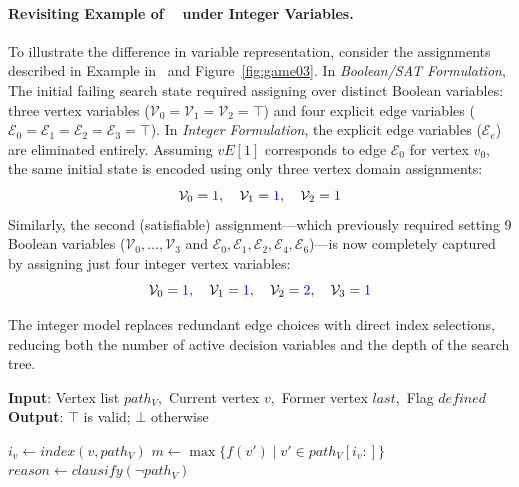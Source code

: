 \documentclass{article}
\begin{document}
\begin{appendices}
\paragraph{Revisiting Example of ~\cite{Hernandez:2026:noc} under Integer Variables.}
To illustrate the difference in variable representation, consider the assignments described in Example in~\cite{Hernandez:2026:noc} and Figure~\ref{fig:game03}.  In \textit{Boolean/SAT Formulation}, The initial failing search state required assigning over  distinct Boolean variables: three vertex variables ($\mathcal{V}_0 = \mathcal{V}_1 = \mathcal{V}_2 = \top$) and four explicit edge variables ($\mathcal{E}_0 = \mathcal{E}_1 = \mathcal{E}_2 = \mathcal{E}_3 = \top$).  In \textit{Integer Formulation}, the explicit edge variables ($\mathcal{E}_e$) are eliminated entirely. Assuming $vE[1]$ corresponds to edge $\mathcal{E}_0$ for vertex $v_0$, the same initial state is encoded using only three vertex domain assignments:
\[
    \mathcal{V}_0 = \textcolor{blue}{1}, \quad \mathcal{V}_1 = \textcolor{blue}{1}, \quad \mathcal{V}_2 = \textcolor{blue}{1}
\]
Similarly, the second (satisfiable) assignment—which previously required setting 9 Boolean variables ($\mathcal{V}_0, \dots, \mathcal{V}_3$ and $\mathcal{E}_0, \mathcal{E}_1, \mathcal{E}_2, \mathcal{E}_4, \mathcal{E}_6$)—is now completely captured by assigning just four integer vertex variables:
\[
    \mathcal{V}_0 = \textcolor{blue}{1}, \quad \mathcal{V}_1 = \textcolor{blue}{1}, \quad \mathcal{V}_2 = \textcolor{blue}{2}, \quad \mathcal{V}_3 = \textcolor{blue}{1}
\]

The integer model replaces redundant edge choices with direct index selections, reducing both the number of active decision variables and the depth of the search tree.

\begin{algorithm}[htb]
\small
\caption{\textbf{\textit{NOCEagerInt}}}
\textbf{Input}: Vertex list $path_V$,\ Current vertex $v$,\ Former vertex $\textit{last}$,\ Flag $\textit{defined}$ \\
\textbf{Output}: $\top$ is valid; $\bot$ otherwise
\begin{algorithmic}[1]
     \label{alg:noc-eager-int:pathcheck}
        \STATE $i_v \gets \textit{index}(v, path_V)$
        \STATE $m \gets \max\{f(v') \mid v' \in path_V[i_v:]\}$
         \label{alg:noc-eager-int:checkopponent}
            \STATE $\textit{reason} \gets \textit{clausify}(\neg path_V)$ \label{alg:noc-eager-int:reason}


\end{algorithmic}
\end{algorithm}
\end{appendices}
\end{document}
